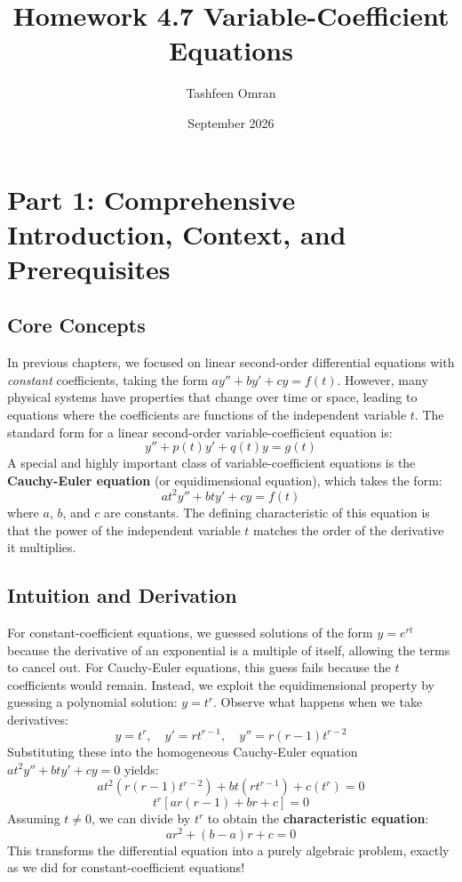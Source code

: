 \documentclass{article}
\title{Homework 4.7 Variable-Coefficient Equations}
\author{Tashfeen Omran}
\date{September 2026}
\begin{document}
\maketitle

\section{Part 1: Comprehensive Introduction, Context, and Prerequisites}

\subsection{Core Concepts}
In previous chapters, we focused on linear second-order differential equations with \textit{constant} coefficients, taking the form $ay'' + by' + cy = f(t)$. However, many physical systems have properties that change over time or space, leading to equations where the coefficients are functions of the independent variable $t$. The standard form for a linear second-order variable-coefficient equation is:
\[ y'' + p(t)y' + q(t)y = g(t) \]
A special and highly important class of variable-coefficient equations is the \textbf{Cauchy-Euler equation} (or equidimensional equation), which takes the form:
\[ at^2 y'' + bty' + cy = f(t) \]
where $a$, $b$, and $c$ are constants. The defining characteristic of this equation is that the power of the independent variable $t$ matches the order of the derivative it multiplies.

\subsection{Intuition and Derivation}
For constant-coefficient equations, we guessed solutions of the form $y = e^{rt}$ because the derivative of an exponential is a multiple of itself, allowing the terms to cancel out. For Cauchy-Euler equations, this guess fails because the $t$ coefficients would remain. 
Instead, we exploit the equidimensional property by guessing a polynomial solution: $y = t^r$. 
Observe what happens when we take derivatives:
\[ y = t^r, \quad y' = r t^{r-1}, \quad y'' = r(r-1)t^{r-2} \]
Substituting these into the homogeneous Cauchy-Euler equation $at^2 y'' + bty' + cy = 0$ yields:
\[ a t^2 (r(r-1)t^{r-2}) + b t (r t^{r-1}) + c (t^r) = 0 \]
\[ t^r [a r(r-1) + br + c] = 0 \]
Assuming $t \neq 0$, we can divide by $t^r$ to obtain the \textbf{characteristic equation}:
\[ ar^2 + (b-a)r + c = 0 \]
This transforms the differential equation into a purely algebraic problem, exactly as we did for constant-coefficient equations!
\end{document}
